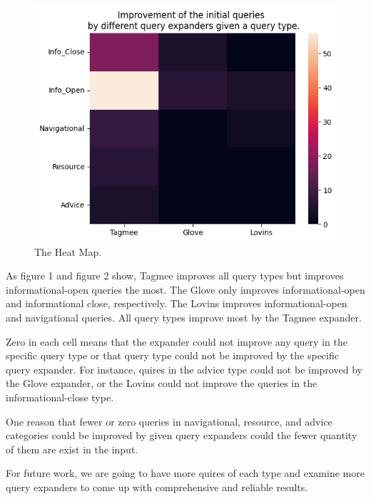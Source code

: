 \documentclass[sigconf]{acmart}
\begin{document}
\begin{figure}[h]
\centering
\includegraphics[width=0.8\columnwidth]{Images/heatmap.png}
\caption{The Heat Map.\label{neural_net}}
\end{figure}



As figure 1 and figure 2 show, Tagmee improves all query types but improves informational-open queries the most. The Glove only improves informational-open and informational close, respectively. The Lovins improves informational-open and navigational queries. All query types improve most by the Tagmee expander.

Zero in each cell means that the expander could not improve any query in the specific query type or that query type could not be improved by the specific query expander. For instance, quires in the advice type could not be improved by the Glove expander, or the Lovins could not improve the queries in the informational-close type.

One reason that fewer or zero queries in navigational, resource, and advice categories could be improved by given query expanders could the fewer quantity of them are exist in the input. 

For future work, we are going to have more quires of each type and examine more query expanders to come up with comprehensive and reliable results.
\newpage



 
\end{document}
